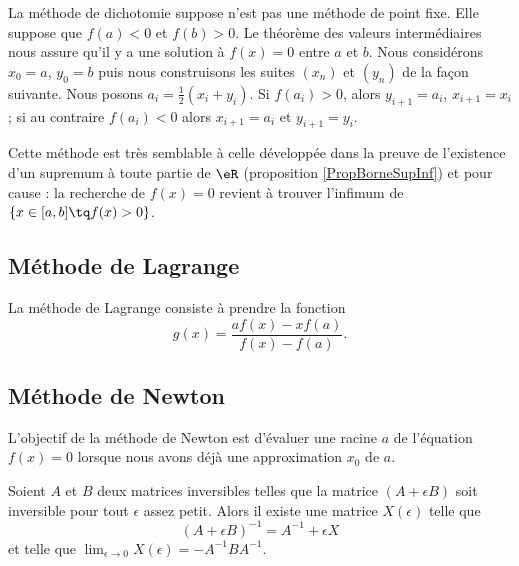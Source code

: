 La méthode de dichotomie suppose n'est pas une méthode de point fixe. Elle suppose que \( f(a)<0\) et \( f(b)>0\). Le théorème des valeurs intermédiaires nous assure qu'il y a une solution à \( f(x)=0\) entre \( a\) et \( b\). Nous considérons \( x_0=a\), \( y_0=b\) puis nous construisons les suites \( (x_n)\) et \( (y_n)\) de la façon suivante. Nous posons \( a_i=\frac{ 1 }{2}(x_i+y_i)\). Si \( f(a_i)>0\), alors \( y_{i+1}=a_i\), \( x_{i+1}=x_i\); si au contraire \( f(a_i)<0\) alors \( x_{i+1}=a_i\) et \( y_{i+1}=y_i\).

Cette méthode est très semblable à celle développée dans la preuve de l'existence d'un supremum à toute partie de \( \eR\) (proposition \ref{PropBorneSupInf}) et pour cause : la recherche de \( f(x)=0\) revient à trouver l'infimum de \( \{ x\in\mathopen[ a , b \mathclose]\tq f(x)>0 \}\).

\subsection{Méthode de Lagrange}

La méthode de Lagrange consiste à prendre la fonction
\begin{equation}
    g(x)=\frac{ af(x)-xf(a) }{ f(x)-f(a) }.
\end{equation}

\subsection{Méthode de Newton}


L'objectif de la méthode de Newton est d'évaluer une racine \( a\) de l'équation \( f(x)=0\) lorsque nous avons déjà une approximation \( x_0\) de \( a\).

\begin{lemma}       \label{LemXdObnV}
    Soient \( A\) et \( B\) deux matrices inversibles telles que la matrice \( (A+\epsilon B)\) soit inversible pour tout \( \epsilon\) assez petit. Alors il existe une matrice \( X(\epsilon)\) telle que
    \begin{equation}
        (A+\epsilon B)^{-1}=A^{-1}+\epsilon X
    \end{equation}
    et telle que \( \lim_{\epsilon\to 0}X(\epsilon)=-A^{-1} BA^{-1}\).
\end{lemma}

